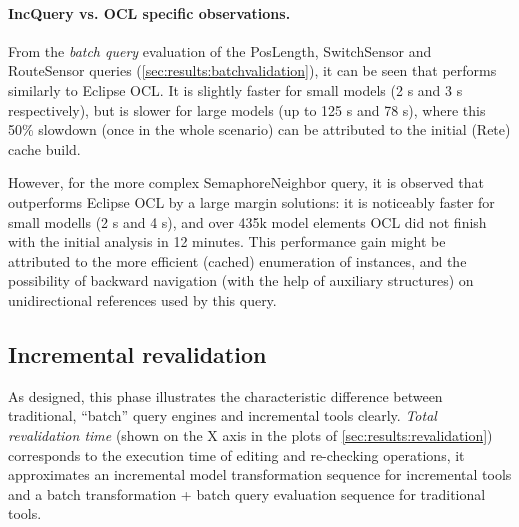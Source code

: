 \paragraph{IncQuery vs. OCL specific observations.}

 
From the \emph{batch query} evaluation of the \textsf{PosLength}, \textsf{SwitchSensor} and \textsf{RouteSensor} queries (\autoref{sec:results:batchvalidation}), it can be seen that \eiq performs similarly to Eclipse OCL. It is slightly faster for small models (2 s and 3 s respectively), but is slower for large models (up to 125 s and 78 s), where this 50\% slowdown (once in the whole scenario) can be attributed to the initial (Rete) cache build.


However, for the more complex \textsf{SemaphoreNeighbor} query, it is observed that \eiq outperforms Eclipse OCL by a large margin solutions: it is noticeably faster for small modells (2 s and 4 s), and over 435k model elements OCL did not finish with the initial analysis in 12 minutes. This performance gain might be attributed to the more efficient (cached) enumeration of instances, and the possibility of backward navigation (with the help of auxiliary structures) on unidirectional references used by this query.

\subsection{Incremental revalidation}
As designed, this phase illustrates the characteristic difference between traditional, ``batch'' query engines and incremental tools clearly. \emph{Total revalidation time} (shown on the X axis in the plots of \autoref{sec:results:revalidation}) corresponds to the execution time of editing and re-checking operations, \ie it approximates an incremental model transformation sequence for incremental tools and a batch transformation + batch query evaluation sequence for traditional tools.

